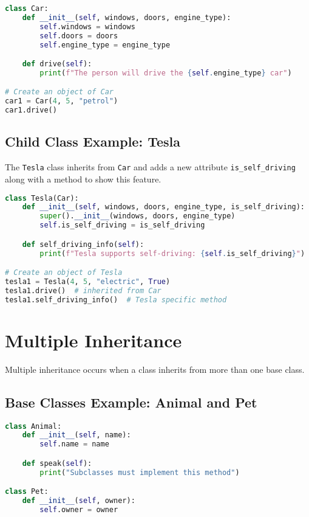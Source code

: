 \begin{lstlisting}[language=Python]
class Car:
    def __init__(self, windows, doors, engine_type):
        self.windows = windows
        self.doors = doors
        self.engine_type = engine_type

    def drive(self):
        print(f"The person will drive the {self.engine_type} car")

# Create an object of Car
car1 = Car(4, 5, "petrol")
car1.drive()
\end{lstlisting}

\subsection{Child Class Example: Tesla}

The \texttt{Tesla} class inherits from \texttt{Car} and adds a new attribute \texttt{is\_self\_driving} along with a method to show this feature.

\begin{lstlisting}[language=Python]
class Tesla(Car):
    def __init__(self, windows, doors, engine_type, is_self_driving):
        super().__init__(windows, doors, engine_type)
        self.is_self_driving = is_self_driving

    def self_driving_info(self):
        print(f"Tesla supports self-driving: {self.is_self_driving}")

# Create an object of Tesla
tesla1 = Tesla(4, 5, "electric", True)
tesla1.drive()  # inherited from Car
tesla1.self_driving_info()  # Tesla specific method
\end{lstlisting}

\section{Multiple Inheritance}

Multiple inheritance occurs when a class inherits from more than one base class.

\subsection{Base Classes Example: Animal and Pet}

\begin{lstlisting}[language=Python]
class Animal:
    def __init__(self, name):
        self.name = name

    def speak(self):
        print("Subclasses must implement this method")

class Pet:
    def __init__(self, owner):
        self.owner = owner
\end{lstlisting}

